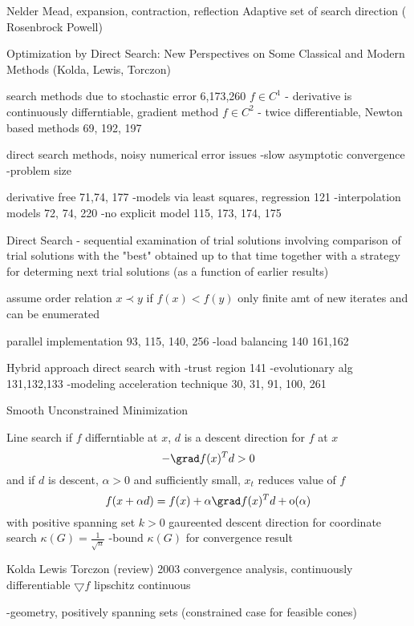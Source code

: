Nelder Mead, expansion, contraction, reflection
Adaptive set of search direction ( Rosenbrock Powell)

Optimization by Direct Search: New Perspectives on Some Classical and Modern Methods (Kolda, Lewis, Torczon) \cite{kolda_2003}


search methods due to stochastic error 6,173,260
$f\in C^1$ - derivative is continuously differntiable, gradient method
$f \in C^2$ - twice differentiable, Newton based methods 69, 192, 197

direct search methods, noisy numerical error
issues
-slow asymptotic convergence
-problem size

derivative free 71,74, 177
-models via least squares, regression 121
-interpolation models 72, 74, 220
-no explicit model 115, 173, 174, 175

Direct Search - sequential examination of trial solutions involving comparison of trial solutions with the "best" obtained up to that time together with a strategy for determing next trial solutions (as a function of earlier results)

assume order relation
$ x \prec y$ if $f(x) < f(y)$
only finite amt of new iterates and can be enumerated

parallel implementation 93, 115, 140, 256
-load balancing 140
161,162

Hybrid approach
direct search with
-trust region 141
-evolutionary alg 131,132,133
-modeling acceleration technique 30, 31, 91, 100, 261

Smooth Unconstrained Minimization

Line search
if $f$ differntiable at $x$, $d$ is a descent direction for $f$ at $x$ 
\begin{equation}
- \grad f(x)^T d > 0
\end{equation}
and if $d$ is descent, $\alpha >0$ and sufficiently small, $x_t$ reduces value of $f$
\begin{equation}
f(x + \alpha d) = f(x) + \alpha \grad f(x)^T d + \mbox{o}(\alpha)
\end{equation}
with positive spanning set $k>0$
gaureented descent direction
for coordinate search $\kappa (G) = \frac{1}{\sqrt{n}}$
-bound $\kappa (G)$ for convergence result

Kolda Lewis Torczon (review) 2003
convergence analysis, continuously differentiable
$\bigtriangledown f$ lipschitz continuous

-geometry, positively spanning sets
(constrained case for feasible cones)

